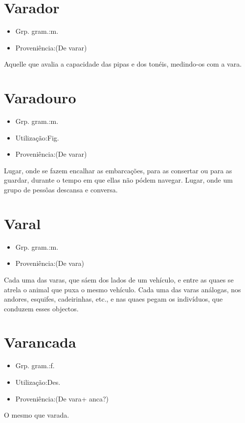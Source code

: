 \documentclass{article}
\begin{document}
\section{Varador}
\begin{itemize}
\item {Grp. gram.:m.}
\end{itemize}
\begin{itemize}
\item {Proveniência:(De \textunderscore varar\textunderscore )}
\end{itemize}
Aquelle que avalia a capacidade das pipas e dos tonéis, medindo-os com a vara.
\section{Varadouro}
\begin{itemize}
\item {Grp. gram.:m.}
\end{itemize}
\begin{itemize}
\item {Utilização:Fig.}
\end{itemize}
\begin{itemize}
\item {Proveniência:(De \textunderscore varar\textunderscore )}
\end{itemize}
Lugar, onde se fazem encalhar as embarcações, para as consertar ou para as guardar, durante o tempo em que ellas não pódem navegar.
Lugar, onde um grupo de pessôas descansa e conversa.
\section{Varal}
\begin{itemize}
\item {Grp. gram.:m.}
\end{itemize}
\begin{itemize}
\item {Proveniência:(De \textunderscore vara\textunderscore )}
\end{itemize}
Cada uma das varas, que sáem dos lados de um vehículo, e entre as quaes se atrela o animal que puxa o mesmo vehículo.
Cada uma das varas análogas, nos andores, esquifes, cadeirinhas, etc., e nas quaes pegam os indivíduos, que conduzem esses objectos.
\section{Varancada}
\begin{itemize}
\item {Grp. gram.:f.}
\end{itemize}
\begin{itemize}
\item {Utilização:Des.}
\end{itemize}
\begin{itemize}
\item {Proveniência:(De \textunderscore vara\textunderscore  + \textunderscore anca\textunderscore ?)}
\end{itemize}
O mesmo que \textunderscore varada\textunderscore .
\end{document}
